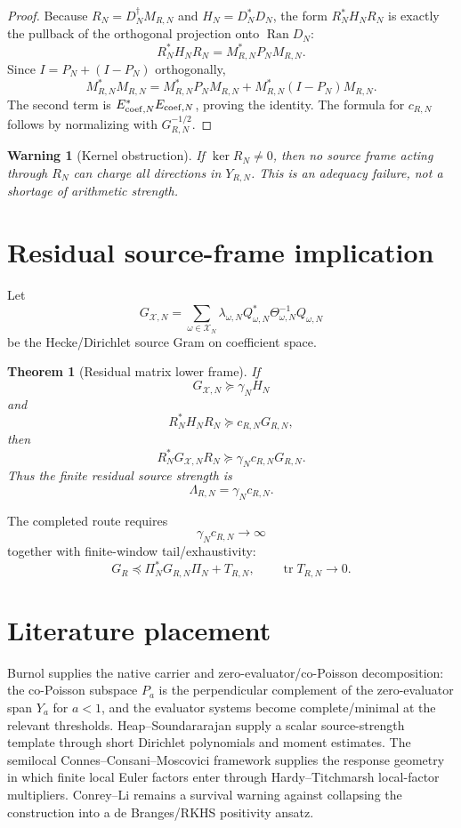\documentclass[11pt]{article}
\newtheorem{theorem}{Theorem}
\newtheorem{warning}{Warning}
\begin{document}
\begin{proof}
Because $R_N=D_N^\dagger M_{R,N}$ and $H_N=D_N^*D_N$, the form $R_N^*H_NR_N$ is exactly the pullback of the orthogonal projection onto $\operatorname{Ran}D_N$:
\[
  R_N^*H_NR_N=M_{R,N}^*P_NM_{R,N}.
\]
Since $I=P_N+(I-P_N)$ orthogonally,
\[
  M_{R,N}^*M_{R,N}=M_{R,N}^*P_NM_{R,N}+M_{R,N}^*(I-P_N)M_{R,N}.
\]
The second term is $E_{{\rm coef},N}^*E_{{\rm coef},N}$, proving the identity. The formula for $c_{R,N}$ follows by normalizing with $G_{R,N}^{-1/2}$.
\end{proof}

\begin{warning}[Kernel obstruction]
If $\ker R_N\neq0$, then no source frame acting through $R_N$ can charge all directions in $Y_{R,N}$. This is an adequacy failure, not a shortage of arithmetic strength.
\end{warning}

\section{Residual source-frame implication}
Let
\[
  G_{\mathcal X,N}=\sum_{\omega\in\mathcal X_N}\lambda_{\omega,N}
  Q_{\omega,N}^*\Theta_{\omega,N}^{-1}Q_{\omega,N}
\]
be the Hecke/Dirichlet source Gram on coefficient space.

\begin{theorem}[Residual matrix lower frame]
If
\[
  G_{\mathcal X,N}\succeq \gamma_N H_N
\]
and
\[
  R_N^*H_NR_N\succeq c_{R,N}G_{R,N},
\]
then
\[
  R_N^*G_{\mathcal X,N}R_N\succeq \gamma_Nc_{R,N}G_{R,N}.
\]
Thus the finite residual source strength is
\[
  \Lambda_{R,N}=\gamma_Nc_{R,N}.
\]
\end{theorem}

The completed route requires
\[
  \gamma_Nc_{R,N}\to\infty
\]
together with finite-window tail/exhaustivity:
\[
  G_R\preceq \Pi_N^*G_{R,N}\Pi_N+T_{R,N},
  \qquad
  \operatorname{tr}T_{R,N}\to0.
\]

\section{Literature placement}
Burnol supplies the native carrier and zero-evaluator/co-Poisson decomposition: the co-Poisson subspace $P_a$ is the perpendicular complement of the zero-evaluator span $Y_a$ for $a<1$, and the evaluator systems become complete/minimal at the relevant thresholds. Heap--Soundararajan supply a scalar source-strength template through short Dirichlet polynomials and moment estimates. The semilocal Connes--Consani--Moscovici framework supplies the response geometry in which finite local Euler factors enter through Hardy--Titchmarsh local-factor multipliers. Conrey--Li remains a survival warning against collapsing the construction into a de Branges/RKHS positivity ansatz.
\end{document}
